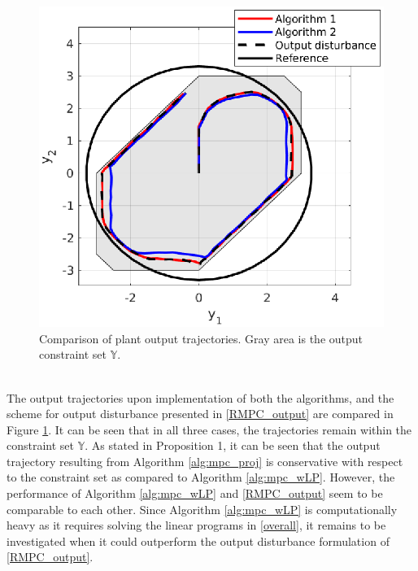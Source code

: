 \documentclass[letterpaper, 10 pt, conference]{ieeeconf}  %
\begin{document}
	\begin{figure}[h]
		\vspace{-3pt}
		\hspace{5pt}
		\includegraphics[scale=0.75]{output_performance.eps}
		\caption{Comparison of plant output trajectories. Gray area is the output constraint set $\mathbb{Y}$.}
		\label{fig:y_trajectories}
	\end{figure} \\
The output trajectories upon implementation of both the algorithms, and the scheme for output disturbance presented in \eqref{RMPC_output} are compared in Figure \ref{fig:y_trajectories}. It can be seen that in all three cases, the trajectories remain within the constraint set $\mathbb{Y}$. As stated in Proposition 1, it can be seen that the output trajectory resulting from Algorithm \ref{alg:mpc_proj} is conservative with respect to the constraint set as compared to Algorithm \ref{alg:mpc_wLP}. However, the performance of Algorithm \ref{alg:mpc_wLP} and \eqref{RMPC_output} seem to be comparable to each other. Since Algorithm \ref{alg:mpc_wLP} is computationally heavy as it requires solving the linear programs in \eqref{overall}, it remains to be investigated when it could outperform the output disturbance formulation of \eqref{RMPC_output}.
\end{document}
